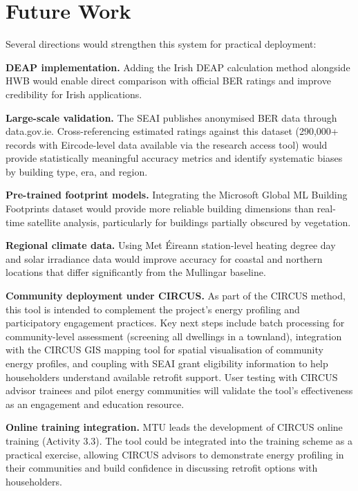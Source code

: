 \documentclass[preprint,12pt,authoryear]{elsarticle}
\begin{document}
\section{Future Work}
\label{sec:future}

Several directions would strengthen this system for practical deployment:

\textbf{DEAP implementation.} Adding the Irish DEAP calculation method alongside HWB would enable direct comparison with official BER ratings and improve credibility for Irish applications.

\textbf{Large-scale validation.} The SEAI publishes anonymised BER data through data.gov.ie. Cross-referencing estimated ratings against this dataset (290,000+ records with Eircode-level data available via the research access tool) would provide statistically meaningful accuracy metrics and identify systematic biases by building type, era, and region.

\textbf{Pre-trained footprint models.} Integrating the Microsoft Global ML Building Footprints dataset \citep{microsoft_buildings_2023} would provide more reliable building dimensions than real-time satellite analysis, particularly for buildings partially obscured by vegetation.

\textbf{Regional climate data.} Using Met \'Eireann station-level heating degree day and solar irradiance data would improve accuracy for coastal and northern locations that differ significantly from the Mullingar baseline.

\textbf{Community deployment under CIRCUS.} As part of the CIRCUS method, this tool is intended to complement the project's energy profiling and participatory engagement practices. Key next steps include batch processing for community-level assessment (screening all dwellings in a townland), integration with the CIRCUS GIS mapping tool for spatial visualisation of community energy profiles, and coupling with SEAI grant eligibility information to help householders understand available retrofit support. User testing with CIRCUS advisor trainees and pilot energy communities will validate the tool's effectiveness as an engagement and education resource.

\textbf{Online training integration.} MTU leads the development of CIRCUS online training (Activity 3.3). The tool could be integrated into the training scheme as a practical exercise, allowing CIRCUS advisors to demonstrate energy profiling in their communities and build confidence in discussing retrofit options with householders.
\end{document}
